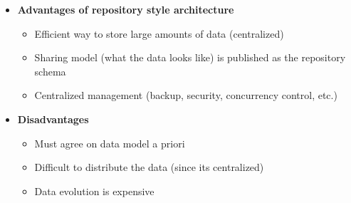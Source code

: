 \documentclass[12pt]{book}
\begin{document}
\begin{itemize}
    \item \textbf{Advantages of repository style architecture}
    \begin{itemize}
        \item Efficient way to store large amounts of data (centralized)
        \item Sharing model (what the data looks like) is published as the repository schema
        \item Centralized management (backup, security, concurrency control, etc.)
    \end{itemize} 
    
    \item \textbf{Disadvantages}
    \begin{itemize}
        \item Must agree on data model a priori
        \item Difficult to distribute the data (since its centralized)
        \item Data evolution is expensive
    \end{itemize} 
\end{itemize}
\end{document}

